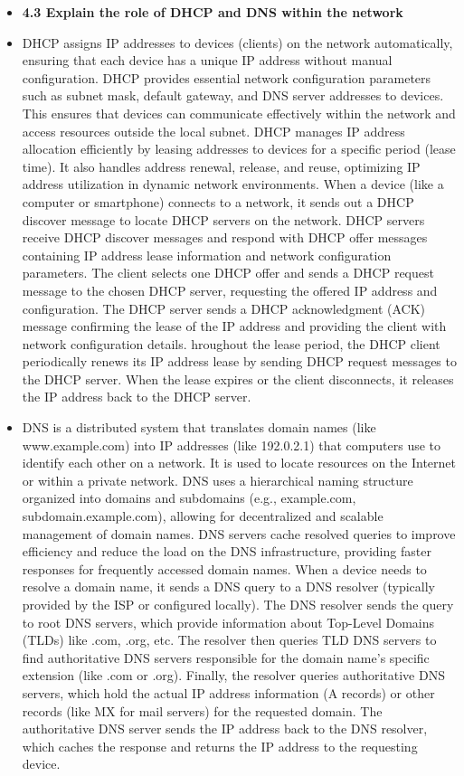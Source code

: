 \documentclass{article}
\begin{document}
\begin{itemize}
  \item \textbf{4.3 Explain the role of DHCP and DNS within the network}
  	\item[] DHCP assigns IP addresses to devices (clients) on the network automatically, ensuring that each device has a unique IP address without manual configuration. DHCP provides essential network configuration parameters such as subnet mask, default gateway, and DNS server addresses to devices. This ensures that devices can communicate effectively within the network and access resources outside the local subnet. DHCP manages IP address allocation efficiently by leasing addresses to devices for a specific period (lease time). It also handles address renewal, release, and reuse, optimizing IP address utilization in dynamic network environments. When a device (like a computer or smartphone) connects to a network, it sends out a DHCP discover message to locate DHCP servers on the network. DHCP servers receive DHCP discover messages and respond with DHCP offer messages containing IP address lease information and network configuration parameters. The client selects one DHCP offer and sends a DHCP request message to the chosen DHCP server, requesting the offered IP address and configuration. The DHCP server sends a DHCP acknowledgment (ACK) message confirming the lease of the IP address and providing the client with network configuration details. hroughout the lease period, the DHCP client periodically renews its IP address lease by sending DHCP request messages to the DHCP server. When the lease expires or the client disconnects, it releases the IP address back to the DHCP server.
	\item[] DNS is a distributed system that translates domain names (like www.example.com) into IP addresses (like 192.0.2.1) that computers use to identify each other on a network. It is used to locate resources on the Internet or within a private network. DNS uses a hierarchical naming structure organized into domains and subdomains (e.g., example.com, subdomain.example.com), allowing for decentralized and scalable management of domain names. DNS servers cache resolved queries to improve efficiency and reduce the load on the DNS infrastructure, providing faster responses for frequently accessed domain names. When a device needs to resolve a domain name, it sends a DNS query to a DNS resolver (typically provided by the ISP or configured locally). The DNS resolver sends the query to root DNS servers, which provide information about Top-Level Domains (TLDs) like .com, .org, etc. The resolver then queries TLD DNS servers to find authoritative DNS servers responsible for the domain name's specific extension (like .com or .org). Finally, the resolver queries authoritative DNS servers, which hold the actual IP address information (A records) or other records (like MX for mail servers) for the requested domain. The authoritative DNS server sends the IP address back to the DNS resolver, which caches the response and returns the IP address to the requesting device.
  

\end{itemize}
\end{document}
